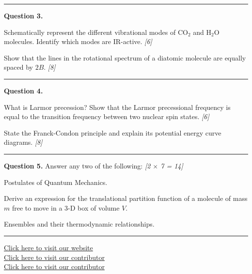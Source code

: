 \documentclass[11pt,a4paper]{article}
\newcommand{\pts}[1]{\hfill   \textit{[#1]}}
\begin{document}
\medskip\rule{\linewidth}{0.2pt}




\noindent   \textbf{Question 3.}

\begin{parts}
  \item Schematically represent the different vibrational modes of $ \text{CO}_2$ and $ \text{H}_2 \text{O}$ molecules. Identify which modes are IR-active. \pts{6}
  \item Show that the lines in the rotational spectrum of a diatomic molecule are equally spaced by $2B$. \pts{8}
\end{parts}

\medskip\rule{\linewidth}{0.2pt}




\noindent   \textbf{Question 4.}

\begin{parts}
  \item What is Larmor precession? Show that the Larmor precessional frequency is equal to the transition frequency between two nuclear spin states. \pts{6}
  \item State the Franck-Condon principle and explain its potential energy curve diagrams. \pts{8}
\end{parts}

\medskip\rule{\linewidth}{0.2pt}




\noindent   \textbf{Question 5.} Answer any two of the following: \pts{2 $ \times$ 7 = 14}

\begin{parts}
  \item Postulates of Quantum Mechanics.
  \item Derive an expression for the translational partition function of a molecule of mass $m$ free to move in a $3$-D box of volume $V$.
  \item Ensembles and their thermodynamic relationships.
\end{parts}

\vfill
\rule{\linewidth}{0.4pt}

\begin{center}\small
  \href{https://bhu-exam.vercel.app/}{Click here to visit our website}\\[4pt]
  \href{https://me-aryan.vercel.app/}{Click here to visit our contributor}\\[4pt]
  \href{https://quashan-me.vercel.app/}{Click here to visit our contributor}
\end{center}
\end{document}
